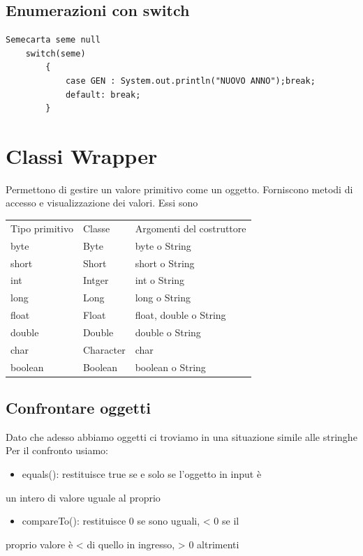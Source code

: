 \documentclass[11pt]{article}
\begin{document}
\subsection{Enumerazioni con switch}
\label{sec:org828a8d7}
\begin{verbatim}
Semecarta seme null
    switch(seme)
        {
            case GEN : System.out.println("NUOVO ANNO");break;
            default: break;
        }

\end{verbatim}
\section{Classi Wrapper}
\label{sec:org5f46ec2}
Permettono di gestire un valore primitivo come un oggetto. Forniscono metodi di accesso e visualizzazione dei valori. Essi sono

\begin{center}
\begin{tabular}{lll}
Tipo primitivo & Classe & Argomenti del costruttore\\
byte & Byte & byte o String\\
short & Short & short o String\\
int & Intger & int o String\\
long & Long & long o String\\
float & Float & float, double o String\\
double & Double & double o String\\
char & Character & char\\
boolean & Boolean & boolean o String\\
\end{tabular}
\end{center}
\subsection{Confrontare oggetti}
\label{sec:org001f7d7}
Dato che adesso abbiamo oggetti ci troviamo in una situazione simile alle stringhe
Per il confronto usiamo:
\begin{itemize}
\item equals(): restituisce true se e solo se l’oggetto in input è
\end{itemize}
un intero di valore uguale al proprio
\begin{itemize}
\item compareTo(): restituisce 0 se sono uguali, < 0 se il
\end{itemize}
proprio valore è < di quello in ingresso, > 0 altrimenti
\end{document}
